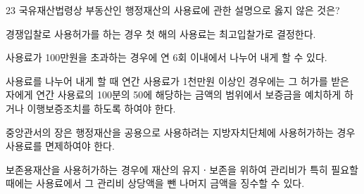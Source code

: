 \begin{question}{23}
국유재산법령상 부동산인 행정재산의 사용료에 관한 설명으로 옳지 않은 것은?
\begin{choices}
  \item 경쟁입찰로 사용허가를 하는 경우 첫 해의 사용료는 최고입찰가로 결정한다.
  \item 사용료가 100만원을 초과하는 경우에 연 6회 이내에서 나누어 내게 할 수 있다.
  \item 사용료를 나누어 내게 할 때 연간 사용료가 1천만원 이상인 경우에는 그 허가를 받은 자에게 연간 사용료의 100분의 50에 해당하는 금액의 범위에서 보증금을 예치하게 하거나 이행보증조치를 하도록 하여야 한다.
  \item 중앙관서의 장은 행정재산을 공용으로 사용하려는 지방자치단체에 사용허가하는 경우 사용료를 면제하여야 한다.
  \item 보존용재산을 사용허가하는 경우에 재산의 유지ㆍ보존을 위하여 관리비가 특히 필요할 때에는 사용료에서 그 관리비 상당액을 뺀 나머지 금액을 징수할 수 있다.
\end{choices}
\end{question}
